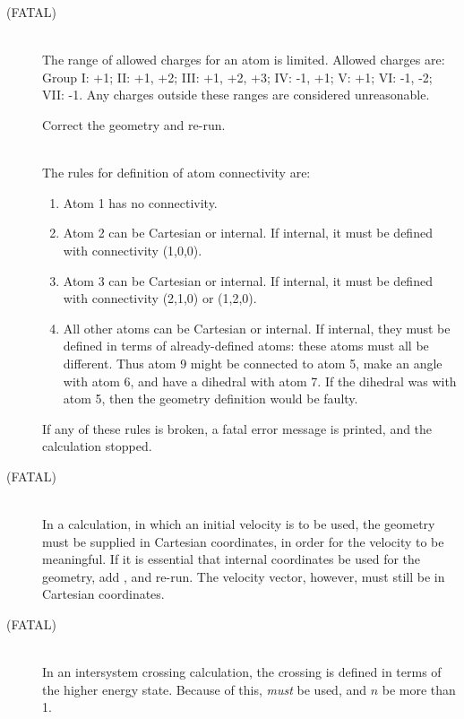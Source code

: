 \begin{description}
\item[ (FATAL)]~\\
The range of allowed charges for an atom is limited.  Allowed charges are:
Group I: +1; II: +1, +2; III: +1, +2, +3; IV: -1, +1; V: +1; VI: -1, -2; VII:
-1.  Any charges outside these ranges are considered unreasonable.

Correct the geometry and re-run.

\item[]~\\
The rules for definition of atom connectivity are:
\begin{enumerate}
\item Atom 1 has no connectivity.
\item Atom 2 can be Cartesian or internal.  If internal, it must be defined
with connectivity (1,0,0).
\item Atom 3 can be Cartesian or internal.  If internal, it must be defined
with connectivity (2,1,0) or (1,2,0).
\item All other atoms can be Cartesian or internal.  If internal, they
must be defined  in  terms  of  already-defined
atoms:   these  atoms must all be different.  Thus atom 9 might
be connected to atom 5, make an angle with atom 6, and  have  a
dihedral  with  atom  7.  If the dihedral was with atom 5, then
the geometry definition would be faulty.
\end{enumerate}

If any of these rules is broken, a fatal error message is  printed,
and the calculation stopped.

\item[ (FATAL)]~\\
In a  calculation, in which an initial velocity is to be used, the
geometry must be supplied in Cartesian coordinates, in order for the velocity
to be meaningful.  If it is essential that internal  coordinates be used for
the geometry, add , and re-run.  The velocity vector, however, must
still be in Cartesian coordinates.

\item[ (FATAL)]~\\
In an intersystem crossing calculation, the crossing is defined in terms of
the higher energy state.  Because of this,  {\em must} be used,
and $n$  be more than 1.


\end{description}
